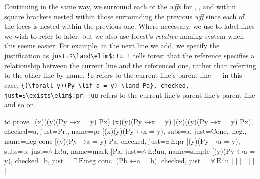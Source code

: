 \documentclass[10pt,british,a4paper,doc2]{ltxdoc}
\newcommand*\pkg[1]{\textsf{#1}}
\newcommand*{\lif}{\ensuremath{\mathbin{\rightarrow}}}
\newcommand*{\liff}{\ensuremath{\mathbin{\leftrightarrow}}}
\newcommand*{\elim}{\,\text{E}}
\newcommand*\wff{\emph{wff}}
\begin{document}
Continuing in the same way, we surround each of the \wff{}s for \nyth*{}, \nyth*{}, \nyth*{} and \nyth*{} within square brackets nested within those surrounding the previous \wff{} since each of the trees is nested within the previous one.
Where necessary, we use  to label lines we wish to refer to later, but we also use \pkg{forest}'s \emph{relative} naming system when this seems easier.
For example, in the next line we add, we specify the justification as \verb|just=$\land\elim$:!u|.
\verb|!| tells \pkg{forest} that the reference specifies a relationship between the current line and the referenced one, rather than referring to the other line by name.
\verb|!u| refers to the current line's parent line --- in this case, \verb|{(\forall y)(Py \lif a = y) \land Pa}, checked, just=$\exists\elim$:pr|.
\verb|!uu| refers to the current line's parent line's parent line and so on.
\begin{latexcode}
\begin{tableau}
  {
    to prove={(\exists x)((\forall y)(Py \lif x = y) \land Px) \sststile{}{} (\exists x)(\forall y)(Py \liff x = y)}
  }
  [{(\exists x)((\forall y)(Py \lif x = y) \land Px)}, checked=a, just=Pr., name=pr
    [{\lnot (\exists x)(\forall y)(Py \liff x = y)}, subs=a, just=Conc.~neg., name=neg conc
      [{(\forall y)(Py \lif a = y) \land Pa}, checked, just=$\exists\elim$:pr
        [{(\forall y)(Py \lif a = y)}, subs=b, just=$\land\elim$:!u, name=mark
          [Pa, just=$\land\elim$:!uu, name=simple
            [{\lnot (\forall y)(Py \liff a = y)}, checked=b, just=$\lnot\exists\elim$:neg conc
              [{\lnot (Pb \liff a = b)}, checked, just=$\lnot\forall\elim$:!u
              ]
            ]
          ]
        ]
      ]
    ]
  ]
\end{tableau}
\end{latexcode}
\end{document}
